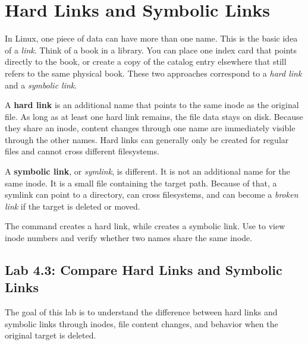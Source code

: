 \section{Hard Links and Symbolic Links}
\label{sec:links}

In Linux, one piece of data can have more than one name. This is the basic idea of a \textit{link}. Think of a book in a library. You can place one index card that points directly to the book, or create a copy of the catalog entry elsewhere that still refers to the same physical book. These two approaches correspond to a \textit{hard link} and a \textit{symbolic link}.

A \textbf{hard link} is an additional name that points to the same inode as the original file. As long as at least one hard link remains, the file data stays on disk. Because they share an inode, content changes through one name are immediately visible through the other names. Hard links can generally only be created for regular files and cannot cross different filesystems.

A \textbf{symbolic link}, or \textit{symlink}, is different. It is not an additional name for the same inode. It is a small file containing the target path. Because of that, a symlink can point to a directory, can cross filesystems, and can become a \textit{broken link} if the target is deleted or moved.

The command  creates a hard link, while  creates a symbolic link. Use  to view inode numbers and verify whether two names share the same inode.

\subsection*{Lab 4.3: Compare Hard Links and Symbolic Links}

The goal of this lab is to understand the difference between hard links and symbolic links through inodes, file content changes, and behavior when the original target is deleted.

